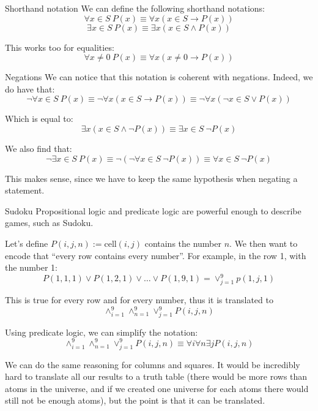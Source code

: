 \documentclass{article}
\begin{document}
\begin{parag}{Shorthand notation}
    We can define the following shorthand notations:
    \[\forall x \in S\ P\left(x\right) \equiv \forall x \left(x \in S \to P\left(x\right)\right)\]
    \[\exists x \in S\ P\left(x\right) \equiv \exists x\left(x \in S \land P\left(x\right)\right)\]

    This works too for equalities:
    \[\forall x \neq 0\ P\left(x\right) \equiv \forall x \left(x \neq 0 \to P\left(x\right)\right)\]

    \begin{subparag}{Negations}
        We can notice that this notation is coherent with negations. Indeed, we do have that:
        \[\lnot \forall x \in S\ P\left(x\right) \equiv \lnot \forall x\left(x \in S \to P\left(x\right)\right) \equiv \lnot \forall x \left(\lnot x \in S \lor P\left(x\right)\right)\]

        Which is equal to: 
        \[\exists x \left(x \in S \land \lnot P\left(x\right)\right) \equiv \exists x \in S\ \lnot P\left(x\right)\]
        

        We also find that:
        \[\lnot \exists x \in S\ P\left(x\right) \equiv \lnot \left(\lnot \forall x \in S\ \lnot P\left(x\right)\right) \equiv \forall x \in S\ \lnot P\left(x\right)\]

        This makes sense, since we have to keep the same hypothesis when negating a statement.
    \end{subparag}
\end{parag}

\begin{parag}{Sudoku}
    Propositional logic and predicate logic are powerful enough to describe games, such as Sudoku.

    Let's define $P\left(i, j, n\right) := \text{cell}\left(i, j\right)$ contains the number $n$. We then want to encode that ``every row contains every number''. For example, in the row 1, with the number 1:
    \[P\left(1, 1, 1\right) \lor P\left(1, 2, 1\right) \lor \ldots \lor P\left(1, 9, 1\right) = \lor_{j=1}^{9} p\left(1, j, 1\right)\]

    This is true for every row and for every number, thus it is translated to
    \[\land_{i=1}^{9} \land_{n=1}^{9} \lor_{j=1}^{9} P\left(i, j, n\right)\]

    Using predicate logic, we  can simplify the notation:
    \[\land_{i=1}^{9} \land_{n=1}^{9} \lor_{j=1}^{9} P\left(i, j, n\right) \equiv \forall i \forall n \exists j P\left(i, j, n\right)\]

    We can do the same reasoning for columns and squares. It would be incredibly hard to translate all our results to a truth table (there would be more rows than atoms in the universe, and if we created one universe for each atoms there would still not be enough atoms), but the point is that it can be translated.
\end{parag}
\end{document}
